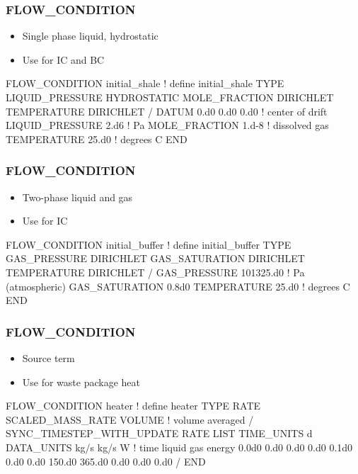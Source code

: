 \documentclass{beamer}
\newcommand\redcomment[1]{{{\color{red} #1}}}
\newcommand\bluecomment[1]{{{\color{blue} #1}}}
\newcommand\greencomment[1]{{{\color{green} #1}}}
\begin{document}
\begin{frame}[fragile]\frametitle{FLOW\_CONDITION}
\begin{itemize}
  \item{Single phase liquid, hydrostatic}
  \item{Use for \redcomment{IC} and \redcomment{BC}}
\end{itemize}

\begin{semiverbatim}
FLOW_CONDITION initial_shale \bluecomment{! define} \greencomment{initial_shale}
  TYPE
    LIQUID_PRESSURE HYDROSTATIC
    MOLE_FRACTION DIRICHLET
    TEMPERATURE DIRICHLET
  /
  DATUM 0.d0 0.d0 0.d0 \bluecomment{! center of drift}
  LIQUID_PRESSURE 2.d6 \bluecomment{! Pa}
  MOLE_FRACTION 1.d-8  \bluecomment{! dissolved gas}
  TEMPERATURE 25.d0    \bluecomment{! degrees C}
END
\end{semiverbatim}
\end{frame}

\begin{frame}[fragile]\frametitle{FLOW\_CONDITION}
\begin{itemize}
  \item{Two-phase liquid and gas}
  \item{Use for \redcomment{IC}}
\end{itemize}

\begin{semiverbatim}
FLOW_CONDITION initial_buffer \bluecomment{! define} \greencomment{initial_buffer}
  TYPE
    GAS_PRESSURE DIRICHLET
    GAS_SATURATION DIRICHLET
    TEMPERATURE DIRICHLET
  /
  GAS_PRESSURE 101325.d0 \bluecomment{! Pa (atmospheric)}
  GAS_SATURATION 0.8d0
  TEMPERATURE 25.d0      \bluecomment{! degrees C}
END
\end{semiverbatim}
\end{frame}

\begin{frame}[fragile]\frametitle{FLOW\_CONDITION}
\begin{itemize}
  \item{\redcomment{Source} term}
  \item{Use for waste package heat}
\end{itemize}

\begin{semiverbatim}
FLOW_CONDITION heater \bluecomment{! define} \greencomment{heater}
  TYPE
    RATE SCALED_MASS_RATE VOLUME \bluecomment{! volume averaged}
  /
  SYNC_TIMESTEP_WITH_UPDATE
  RATE LIST
    TIME_UNITS d
    DATA_UNITS kg/s kg/s W
    \bluecomment{! time liquid gas energy}
     0.0d0 0.d0 0.d0   0.d0
     0.1d0 0.d0 0.d0 150.d0
    365.d0 0.d0 0.d0   0.d0
  /
END
\end{semiverbatim}
\end{frame}
\end{document}
